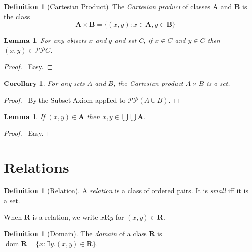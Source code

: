 \documentclass{article}
\let\qed\relax
\newtheorem{lemma}[axiom]{Lemma}
\newtheorem{corollary}{Corollary}[axiom]
\theoremstyle{definition}
\newtheorem{definition}[axiom]{Definition}
\newcommand{\dom}{\ensuremath{\operatorname{dom}}}
\begin{document}
    \begin{definition}[Cartesian Product]
        The \emph{Cartesian product} of classes $\mathbf{A}$ and $\mathbf{B}$ is the class
        \[ \mathbf{A} \times \mathbf{B} = \{ (x,y) : x \in \mathbf{A}, y \in \mathbf{B} \} \enspace . \]
    \end{definition}

    \begin{lemma}
        For any objects $x$ and $y$ and set $C$, if $x \in C$ and $y \in C$ then $(x,y) \in \mathcal{PP} C$.
    \end{lemma}

    \begin{proof}
        \pf\ Easy. \qed
    \end{proof}

    \begin{corollary}
        For any sets $A$ and $B$, the Cartesian product $A \times B$ is a set.
    \end{corollary}

    \begin{proof}
        \pf\ By the Subset Axiom applied to $\mathcal{PP}(A \cup B)$. \qed
    \end{proof}

    \begin{lemma}
        If $(x,y) \in \mathbf{A}$ then $x, y \in \bigcup \bigcup \mathbf{A}$.
    \end{lemma}

    \begin{proof}
        \pf\ Easy. \qed
    \end{proof}

    \section{Relations}

    \begin{definition}[Relation]
        A \emph{relation} is a class of ordered pairs. It is \emph{small} iff it is a set.

        When $\mathbf{R}$ is a relation, we write $x \mathbf{R} y$ for $(x,y) \in \mathbf{R}$.
    \end{definition}

    \begin{definition}[Domain]
        The \emph{domain} of a class $\mathbf{R}$ is $\dom \mathbf{R} = \{ x : \exists y. (x,y) \in \mathbf{R} \}$.
    \end{definition}
\end{document}
